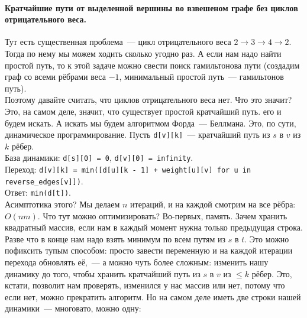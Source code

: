 \documentclass{article}
\begin{document}
    \paragraph{Кратчайшие пути от выделенной вершины во взвешеном графе без циклов отрицательного веса.}
    \begin{figure}[H]
    \end{figure}\noindent
    Тут есть существенная проблема~--- цикл отрицательного веса $2\to3\to4\to2$. Тогда по нему мы можем ходить сколько угодно раз. А если нам надо найти простой путь, то к этой задаче можно свести поиск гамильтонова пути (создадим граф со всеми рёбрами веса $-1$, минимальный простой путь~--- гамильтонов путь).\\
    Поэтому давайте считать, что циклов отрицательного веса нет. Что это значит? Это, на самом деле, значит, что существует простой кратчайший путь. его и будем искать. А искать мы будем алгоритмом Форда~--- Беллмана. Это, по сути, динамическое программирование. Пусть \texttt{d[v][k]}~--- кратчайший путь из $s$ в $v$ из $k$ рёбер.\\
    База динамики: \texttt{d[s][0] = 0}, \texttt{d[v][0] = infinity}.\\
    Переход: \texttt{d[v][k] = min([d[u][k - 1] + weight[u][v] for u in reverse_edges[v]])}.\\
    Ответ: \texttt{min(d[t])}.\\
    Асимптотика этого? Мы делаем $n$ итераций, и на каждой смотрим на все рёбра: $O(nm)$. Что тут можно оптимизировать? Во-первых, память. Зачем хранить квадратный массив, если нам в каждый момент нужна только предыдущая строка. Разве что в конце нам надо взять минимум по всем путям из $s$ в $t$. Это можно пофиксить тупым способом: просто завести переменную и на каждой итерации перехода обновлять её,~--- а можно чуть более сложным: изменить нашу динамику до того, чтобы хранить кратчайший путь из $s$ в $v$ из $\leqslant k$ рёбер. Это, кстати, позволит нам проверять, изменился у нас массив или нет, потому что если нет, можно прекратить алгоритм. Но на самом деле иметь две строки нашей динамики~--- многовато, можно одну:
\end{document}
